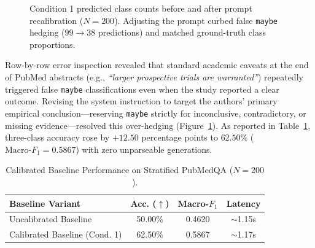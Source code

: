 \documentclass[10pt,twocolumn,letterpaper]{article}
\begin{document}
\begin{figure}[t]
\centering
{}
\caption{Condition 1 predicted class counts before and after prompt recalibration ($N=200$). Adjusting the prompt curbed false \texttt{maybe} hedging ($99 \to 38$ predictions) and matched ground-truth class proportions.}
\label{fig:calibration}
\end{figure}

Row-by-row error inspection revealed that standard academic caveats at the end of PubMed abstracts (e.g., \textit{``larger prospective trials are warranted''}) repeatedly triggered false \texttt{maybe} classifications even when the study reported a clear outcome. Revising the system instruction to target the authors' primary empirical conclusion—reserving \texttt{maybe} strictly for inconclusive, contradictory, or missing evidence—resolved this over-hedging (Figure~\ref{fig:calibration}). As reported in Table~\ref{tab:baseline_metrics}, three-class accuracy rose by $+12.50$ percentage points to $62.50\%$ ($\text{Macro-}F_1 = 0.5867$) with zero unparseable generations.

\begin{table}[t]
\centering
\caption{Calibrated Baseline Performance on Stratified PubMedQA ($N=200$).}
\label{tab:baseline_metrics}
\small
\begin{tabularx}{\columnwidth}{>{\raggedright\arraybackslash}X c c c}
\toprule
\textbf{Baseline Variant} & \textbf{Acc. ($\uparrow$)} & \textbf{Macro-$F_1$} & \textbf{Latency} \\
\midrule
Uncalibrated Baseline & 50.00\% & 0.4620 & $\sim$1.15s \\
Calibrated Baseline (Cond. 1) & 62.50\% & 0.5867 & $\sim$1.17s \\
\bottomrule
\end{tabularx}
\end{table}
\end{document}
